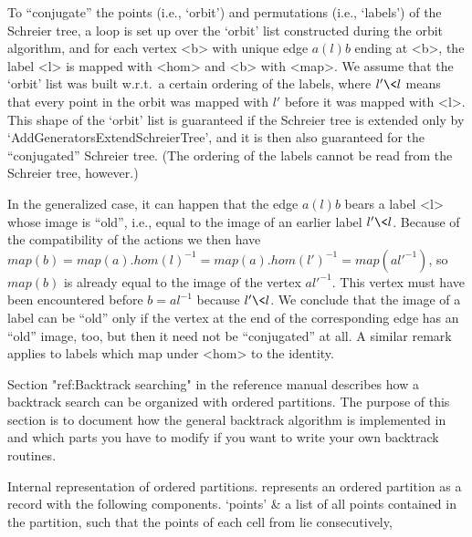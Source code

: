 To ``conjugate''  the  points  (i.e., `orbit')  and  permutations  (i.e.,
`labels') of the Schreier  tree, a loop is  set up over the `orbit'  list
constructed  during the  orbit algorithm,  and for each  vertex  <b> with
unique edge $a(l)b$ ending at  <b>, the label  <l> is mapped with
<hom> and <b> with   <map>. We assume  that  the `orbit' list   was built
w.r.t.~a  certain ordering of the  labels, where $l'\<l$ means that every
point in the  orbit was mapped with  $l'$ before it  was mapped with <l>.
This shape of the  `orbit'  list is guaranteed if   the Schreier tree  is
extended only by  `AddGeneratorsExtendSchreierTree', and it  is then also
guaranteed  for the ``conjugated''  Schreier  tree. (The  ordering of the
labels cannot be read from the Schreier tree, however.)

In the generalized case, it   can happen that the   edge $a(l)b$
bears a label <l> whose image is ``old'', i.e.,  equal to the image of an
earlier label  $l'\<l$. Because of  the  compatibility of the  actions we
then have   $map(b)    = map(a).  hom(l)^{-1}   =   map(a).hom(l')^{-1} =
map(a{l'}^{-1})$, so $map(b)$ is already equal to the image of the vertex
$a{l'}^{-1}$. This vertex must have been encountered before $b = al^{-1}$
because $l'\<l$. We  conclude that the image of   a label can  be ``old''
only if the vertex at  the end of  the corresponding edge has an  ``old''
image,  too, but then  it need  not be  ``conjugated''  at all. A similar
remark applies to labels which map under <hom> to the identity.


\begingroup%
\def\R{{\cal R}} \def\I{{\cal I}}%

Section "ref:Backtrack searching" in the reference manual describes how a
backtrack search can be organized with ordered partitions. The purpose of
this section  is  to document  how  the general   backtrack algorithm  is
implemented in {\GAP} and which  parts you have to modify  if you want to
write your own backtrack routines.

\medskip
{}%
{\bsf   Internal   representation  of  ordered  partitions.}\quad  {\GAP}
represents an   ordered   partition  as a  record    with   the following
components.
\beginitems
`points' &
        a list  of all points contained in  the  partition, such that the
        points of each cell from lie consecutively,

